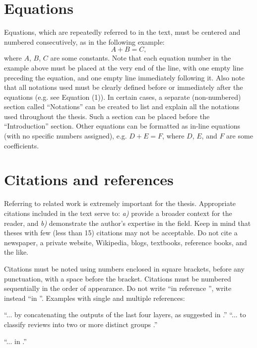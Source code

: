 \documentclass[12pt]{report}
\begin{document}
\section{Equations}
Equations, which are repeatedly referred to in the text, must be centered and numbered consecutively, as in the following example:
\begin{equation}
    A+B=C,
\end{equation}
where $A$, $B$, $C$ are some constants. Note that each equation number in the example above must be placed at the very end of the line, with one empty line preceding the equation, and one empty line immediately following it. Also note that all notations used must be clearly defined before or immediately after the equations (e.g. see Equation (1)). In certain cases, a separate (non-numbered) section called “Notations” can be created to list and explain all the notations used throughout the thesis. Such a section can be placed before the “Introduction” section. Other equations can be formatted as in-line equations (with no specific numbers assigned), e.g. $D+E=F$, where $D$, $E$, and $F$ are some coefficients. 

\section{Citations and references}
Referring to related work is extremely important for the thesis. Appropriate citations included in the text serve to: \textit{a)} provide a broader context for the reader, and \textit{b)} demonstrate the author’s expertise in the field. Keep in mind that theses with few (less than 15) citations may not be acceptable. Do not cite a newspaper, a private website, Wikipedia, blogs, textbooks, reference books, and the like.

Citations must be noted using numbers enclosed in square brackets, before any punctuation, with a space before the bracket. Citations must be numbered sequentially in the order of appearance. Do not write “in reference \cite{pennington2014glove}”, write instead “in \cite{pennington2014glove}”. Examples with single and multiple references:

“... by concatenating the outputs of the last four layers, as suggested in \cite{pennington2014glove}.” “... to classify reviews into two or more distinct groups \cite{pennington2014glove, nadeau2003inference}.”

“... in \cite{pennington2014glove, nadeau2003inference, pluto}.”
\end{document}
